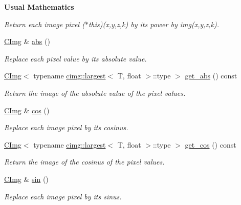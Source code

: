 \begin{Indent}{\bf Usual Mathematics}
\begin{DoxyCompactItemize}
\begin{DoxyCompactList}\small\item\em Return each image pixel ($\ast$this)(x,y,z,k) by its power by {\ttfamily img(x,y,z,k)}. \item\end{DoxyCompactList}\item 
\hyperlink{structcimg__library_1_1_c_img}{CImg} \& \hyperlink{structcimg__library_1_1_c_img_aa16c123928d15dc1c7f48f786cc242b0}{abs} ()
\begin{DoxyCompactList}\small\item\em Replace each pixel value by its absolute value. \item\end{DoxyCompactList}\item 
\hyperlink{structcimg__library_1_1_c_img}{CImg}$<$ typename \hyperlink{structcimg__library_1_1cimg_1_1largest}{cimg::largest}$<$ T, float $>$::type $>$ \hyperlink{structcimg__library_1_1_c_img_ac1cbb36d947693c46d4b44d99f354c0d}{get\_\-abs} () const 
\begin{DoxyCompactList}\small\item\em Return the image of the absolute value of the pixel values. \item\end{DoxyCompactList}\item 
\hyperlink{structcimg__library_1_1_c_img}{CImg} \& \hyperlink{structcimg__library_1_1_c_img_a3aba6102a17c99c6ec39258f4e69abf8}{cos} ()
\begin{DoxyCompactList}\small\item\em Replace each image pixel by its cosinus. \item\end{DoxyCompactList}\item 
\hyperlink{structcimg__library_1_1_c_img}{CImg}$<$ typename \hyperlink{structcimg__library_1_1cimg_1_1largest}{cimg::largest}$<$ T, float $>$::type $>$ \hyperlink{structcimg__library_1_1_c_img_a28919568ffb4a97d820bd94ee4f474b0}{get\_\-cos} () const 
\begin{DoxyCompactList}\small\item\em Return the image of the cosinus of the pixel values. \item\end{DoxyCompactList}\item 
\hyperlink{structcimg__library_1_1_c_img}{CImg} \& \hyperlink{structcimg__library_1_1_c_img_a9c15b23160795b53834a54e0d72d13cd}{sin} ()
\begin{DoxyCompactList}\small\item\em Replace each image pixel by its sinus. \item\end{DoxyCompactList}\item 

\end{DoxyCompactItemize}
\end{Indent}
